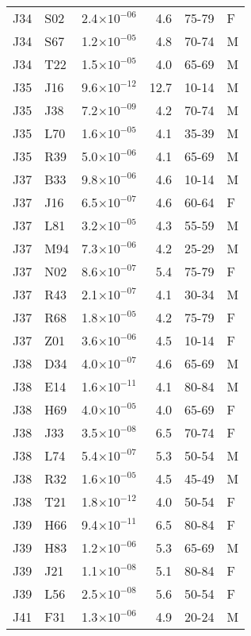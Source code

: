 \begin{longtable}{lllrll}
   J34 & S02 & 2.4$\times10^{-06}$ & 4.6 & 75-79 & F \\ 
   J34 & S67 & 1.2$\times10^{-05}$ & 4.8 & 70-74 & M \\ 
   J34 & T22 & 1.5$\times10^{-05}$ & 4.0 & 65-69 & M \\ 
   J35 & J16 & 9.6$\times10^{-12}$ & 12.7 & 10-14 & M \\ 
   J35 & J38 & 7.2$\times10^{-09}$ & 4.2 & 70-74 & M \\ 
   J35 & L70 & 1.6$\times10^{-05}$ & 4.1 & 35-39 & M \\ 
   J35 & R39 & 5.0$\times10^{-06}$ & 4.1 & 65-69 & M \\ 
   J37 & B33 & 9.8$\times10^{-06}$ & 4.6 & 10-14 & M \\ 
   J37 & J16 & 6.5$\times10^{-07}$ & 4.6 & 60-64 & F \\ 
   J37 & L81 & 3.2$\times10^{-05}$ & 4.3 & 55-59 & M \\ 
   J37 & M94 & 7.3$\times10^{-06}$ & 4.2 & 25-29 & M \\ 
   J37 & N02 & 8.6$\times10^{-07}$ & 5.4 & 75-79 & F \\ 
   J37 & R43 & 2.1$\times10^{-07}$ & 4.1 & 30-34 & M \\ 
   J37 & R68 & 1.8$\times10^{-05}$ & 4.2 & 75-79 & F \\ 
   J37 & Z01 & 3.6$\times10^{-06}$ & 4.5 & 10-14 & F \\ 
   J38 & D34 & 4.0$\times10^{-07}$ & 4.6 & 65-69 & M \\ 
   J38 & E14 & 1.6$\times10^{-11}$ & 4.1 & 80-84 & M \\ 
   J38 & H69 & 4.0$\times10^{-05}$ & 4.0 & 65-69 & F \\ 
   J38 & J33 & 3.5$\times10^{-08}$ & 6.5 & 70-74 & F \\ 
   J38 & L74 & 5.4$\times10^{-07}$ & 5.3 & 50-54 & M \\ 
   J38 & R32 & 1.6$\times10^{-05}$ & 4.5 & 45-49 & M \\ 
   J38 & T21 & 1.8$\times10^{-12}$ & 4.0 & 50-54 & F \\ 
   J39 & H66 & 9.4$\times10^{-11}$ & 6.5 & 80-84 & F \\ 
   J39 & H83 & 1.2$\times10^{-06}$ & 5.3 & 65-69 & M \\ 
   J39 & J21 & 1.1$\times10^{-08}$ & 5.1 & 80-84 & F \\ 
   J39 & L56 & 2.5$\times10^{-08}$ & 5.6 & 50-54 & F \\ 
   J41 & F31 & 1.3$\times10^{-06}$ & 4.9 & 20-24 & M \\ 

\end{longtable}
